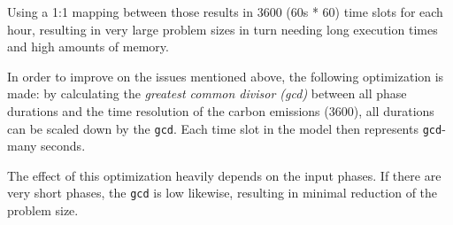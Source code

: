 Using a 1:1 mapping between those results in 3600 (60s * 60) time slots for each hour, resulting in very large problem sizes in turn needing long execution times and high amounts of memory.

In order to improve on the issues mentioned above, the following optimization is made: by calculating the \emph{greatest common divisor (gcd)} between all phase durations and the time resolution of the carbon emissions (3600), all durations can be scaled down by the \verb|gcd|. Each time slot in the model then represents \verb|gcd|-many seconds.

The effect of this optimization heavily depends on the input phases. 
If there are very short phases, the \verb|gcd| is low likewise, resulting in minimal reduction of the problem size.
